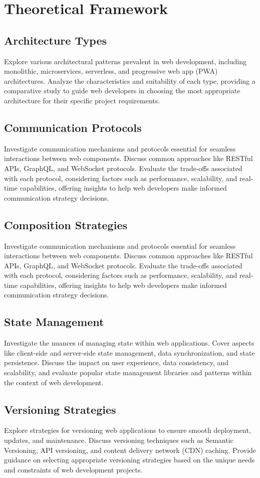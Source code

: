 \chapter{Theoretical Framework}
\label{chap:Theoretical-Framework} 

\section{Architecture Types}
Explore various architectural patterns prevalent in web development, including monolithic, microservices, serverless, and progressive web app (PWA) architectures. Analyze the characteristics and suitability of each type, providing a comparative study to guide web developers in choosing the most appropriate architecture for their specific project requirements.

\section{Communication Protocols}
Investigate communication mechanisms and protocols essential for seamless interactions between web components. Discuss common approaches like RESTful APIs, GraphQL, and WebSocket protocols. Evaluate the trade-offs associated with each protocol, considering factors such as performance, scalability, and real-time capabilities, offering insights to help web developers make informed communication strategy decisions.

\section{Composition Strategies}
Investigate communication mechanisms and protocols essential for seamless interactions between web components. Discuss common approaches like RESTful APIs, GraphQL, and WebSocket protocols. Evaluate the trade-offs associated with each protocol, considering factors such as performance, scalability, and real-time capabilities, offering insights to help web developers make informed communication strategy decisions.

\section{State Management}
Investigate the nuances of managing state within web applications. Cover aspects like client-side and server-side state management, data synchronization, and state persistence. Discuss the impact on user experience, data consistency, and scalability, and evaluate popular state management libraries and patterns within the context of web development.

\section{Versioning Strategies}
Explore strategies for versioning web applications to ensure smooth deployment, updates, and maintenance. Discuss versioning techniques such as Semantic Versioning, API versioning, and content delivery network (CDN) caching. Provide guidance on selecting appropriate versioning strategies based on the unique needs and constraints of web development projects.
